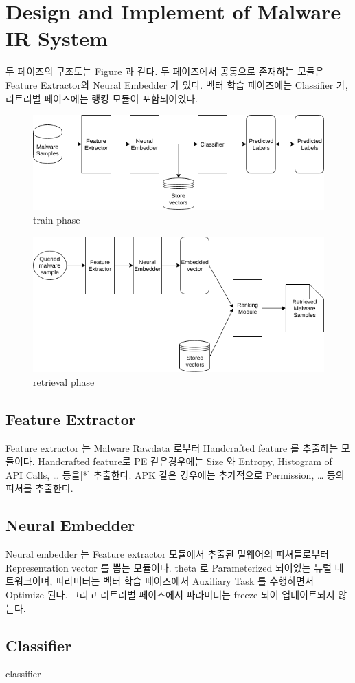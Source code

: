 

\section{Design and Implement of Malware IR System}

두 페이즈의 구조도는 Figure 과 같다. 두 페이즈에서 공통으로 존재하는 모듈은 Feature Extractor와 Neural Embedder 가 있다. 벡터 학습 페이즈에는 Classifier 가, 리트리벌 페이즈에는 랭킹 모듈이 포함되어있다. 
\begin{figure}
  \includegraphics[width=\linewidth]{../figures/train_phase.png}
  \caption{train phase}
  \label{fig:one}
\end{figure}
\begin{figure}
  \includegraphics[width=\linewidth]{../figures/retrieval_phase.png}
  \caption{retrieval phase}
  \label{fig:two}
\end{figure}


\subsection{Feature Extractor}

Feature extractor 는 Malware Rawdata 로부터 Handcrafted feature 를 추출하는 모듈이다. Handcrafted feature로 PE 같은경우에는 Size 와 Entropy, Histogram of API Calls, … 등을[*] 추출한다. APK 같은 경우에는 추가적으로 Permission,  … 등의 피쳐를 추출한다. 


\subsection{Neural Embedder}
Neural embedder 는 Feature extractor 모듈에서 추출된 멀웨어의 피쳐들로부터 Representation vector 를 뽑는 모듈이다. theta 로 Parameterized 되어있는 뉴럴 네트워크이며, 파라미터는 벡터 학습 페이즈에서 Auxiliary Task 를 수행하면서 Optimize 된다. 그리고 리트리벌 페이즈에서 파라미터는 freeze 되어 업데이트되지 않는다. 

\subsection{Classifier}

classifier



